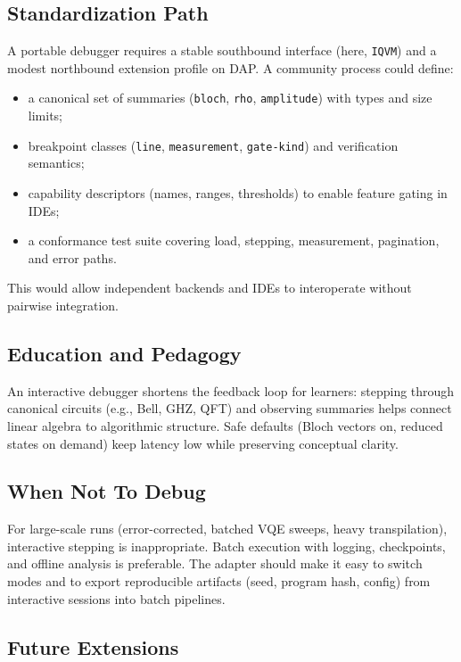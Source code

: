 \documentclass[12pt]{article}
\begin{document}
\begin{itemize}
\subsection{Standardization Path}

A portable debugger requires a stable southbound interface (here, \texttt{IQVM}) and a modest northbound extension profile on DAP. A community process could define:
\begin{itemize}
  \item a canonical set of summaries (\texttt{bloch}, \texttt{rho}, \texttt{amplitude}) with types and size limits;
  \item breakpoint classes (\texttt{line}, \texttt{measurement}, \texttt{gate-kind}) and verification semantics;
  \item capability descriptors (names, ranges, thresholds) to enable feature gating in IDEs;
  \item a conformance test suite covering load, stepping, measurement, pagination, and error paths.
\end{itemize}
This would allow independent backends and IDEs to interoperate without pairwise integration.

\subsection{Education and Pedagogy}

An interactive debugger shortens the feedback loop for learners: stepping through canonical circuits (e.g., Bell, GHZ, QFT) and observing summaries helps connect linear algebra to algorithmic structure. Safe defaults (Bloch vectors on, reduced states on demand) keep latency low while preserving conceptual clarity.

\subsection{When Not To Debug}

For large-scale runs (error-corrected, batched VQE sweeps, heavy transpilation), interactive stepping is inappropriate. Batch execution with logging, checkpoints, and offline analysis is preferable. The adapter should make it easy to switch modes and to export reproducible artifacts (seed, program hash, config) from interactive sessions into batch pipelines.

\subsection{Future Extensions}


\end{itemize}
\end{document}
